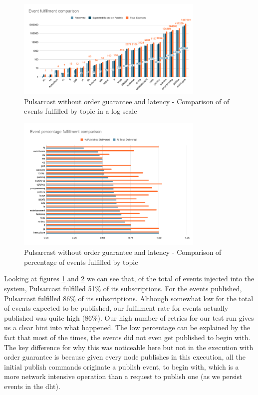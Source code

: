 \begin{figure}[!htb]
  \centering
  \includegraphics[width=0.8\textwidth]{img/graph-pulsarcast-latency-event-fulfillment-comparison.png}
  \caption{Pulsarcast without order guarantee and latency - Comparison of of events fulfilled by topic in a log scale}
  \label{fig:graph-pulsarcast-latency-event-fulfillment-comparison}
\end{figure}

\begin{figure}[!htb]
  \centering
  \includegraphics[width=0.8\textwidth]{img/graph-pulsarcast-latency-event-percentage-fulfillment-comparison.png}
  \caption{Pulsarcast without order guarantee and latency - Comparison of percentage of events fulfilled by topic}
  \label{fig:graph-pulsarcast-latency-event-percentage-fulfillment-comparison}
\end{figure}

Looking at figures
\ref{fig:graph-pulsarcast-latency-event-fulfillment-comparison} and
\ref{fig:graph-pulsarcast-latency-event-percentage-fulfillment-comparison} we
can see that, of the total of events injected into the system, Pulsarcast
fulfilled 51\% of its subscriptions. For the  events published, Pulsarcast
fulfilled 86\% of its subscriptions. Although somewhat low for the total of
events expected to be published, our fulfilment rate for events actually
published was quite high (86\%). Our high number of retries for our test run
gives us a clear hint into what happened. The low percentage can be explained
by the fact that most of the times, the events did not even get published to
begin with. The key difference for why this was noticeable here but not in the
execution with order guarantee is because given every node publishes in this
execution, all the initial publish commands originate a publish event, to begin
with, which is a more network intensive operation than a request to publish one
(as we persist events in the \acrshort{dht}).


